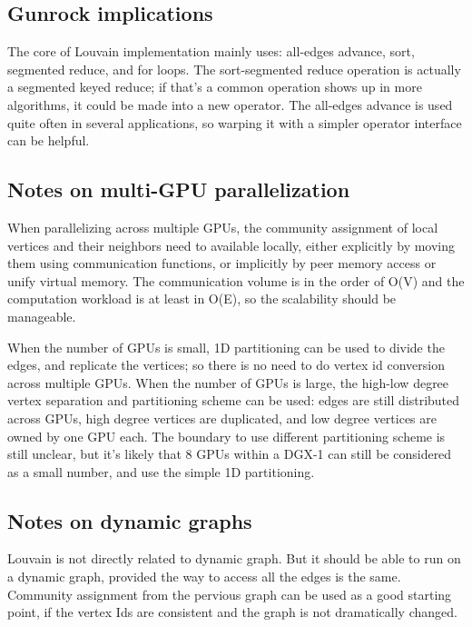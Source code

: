 \documentclass[10pt,article,oneside]{memoir}
\begin{document}
\subsection{Gunrock implications}\label{gunrock-implications-1}

The core of Louvain implementation mainly uses: all-edges advance, sort,
segmented reduce, and for loops. The sort-segmented reduce operation is
actually a segmented keyed reduce; if that's a common operation shows up
in more algorithms, it could be made into a new operator. The all-edges
advance is used quite often in several applications, so warping it with
a simpler operator interface can be helpful.

\subsection{Notes on multi-GPU
parallelization}\label{notes-on-multi-gpu-parallelization-1}

When parallelizing across multiple GPUs, the community assignment of
local vertices and their neighbors need to available locally, either
explicitly by moving them using communication functions, or implicitly
by peer memory access or unify virtual memory. The communication volume
is in the order of O(\textbar{}V\textbar{}) and the computation workload
is at least in O(\textbar{}E\textbar{}), so the scalability should be
manageable.

When the number of GPUs is small, 1D partitioning can be used to divide
the edges, and replicate the vertices; so there is no need to do vertex
id conversion across multiple GPUs. When the number of GPUs is large,
the high-low degree vertex separation and partitioning scheme can be
used: edges are still distributed across GPUs, high degree vertices are
duplicated, and low degree vertices are owned by one GPU each. The
boundary to use different partitioning scheme is still unclear, but it's
likely that 8 GPUs within a DGX-1 can still be considered as a small
number, and use the simple 1D partitioning.

\subsection{Notes on dynamic graphs}\label{notes-on-dynamic-graphs-1}

Louvain is not directly related to dynamic graph. But it should be able
to run on a dynamic graph, provided the way to access all the edges is
the same. Community assignment from the pervious graph can be used as a
good starting point, if the vertex Ids are consistent and the graph is
not dramatically changed.
\end{document}
